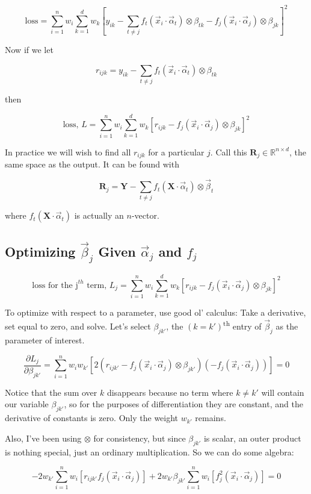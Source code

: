 \documentclass[12pt]{article}
\begin{document}
$$\text{loss} = \sum_{i=1}^n w_i \sum_{k=1}^d w_k [y_{ik} - \sum_{t \neq j} f_t(\vec{x}_i \cdot \vec{\alpha}_t) \otimes \beta_{tk} - f_j(\vec{x}_i \cdot \vec{\alpha}_j) \otimes \beta_{jk}]^2$$

Now if we let

$$r_{ijk} = y_{ik} - \sum_{t \neq j} f_t(\vec{x}_i \cdot \vec{\alpha}_t) \otimes \beta_{tk}$$

then

$$\text{loss, } L = \sum_{i=1}^n w_i \sum_{k=1}^d w_k [r_{ijk} - f_j(\vec{x}_i \cdot \vec{\alpha}_j) \otimes \beta_{jk}]^2$$

In practice we will wish to find all $r_{ijk}$ for a particular $j$. Call this $\pmb{R}_j \in \mathbb{R}^{n \times d}$, the same space as the output. It can be found with

$$\pmb{R}_j = \pmb{Y} - \sum_{t \neq j} f_t(\pmb{X} \cdot \vec{\alpha}_t) \otimes \vec{\beta}_t$$

where $f_t(\pmb{X} \cdot \vec{\alpha}_t)$ is actually an $n$-vector.

\subsection{Optimizing $\vec{\beta}_j$ Given $\vec{\alpha}_j$ and $f_j$}

$$\text{loss for the j}^{th}\text{ term, } L_j = \sum_{i=1}^n w_i \sum_{k=1}^d w_k [r_{ijk} - f_j(\vec{x}_i \cdot \vec{\alpha}_j) \otimes \beta_{jk}]^2$$

To optimize with respect to a parameter, use good ol' calculus: Take a derivative, set equal to zero, and solve. Let's select $\beta_{jk'}$, the $(k=k')$\textsuperscript{th} entry of $\vec{\beta}_j$ as the parameter of interest.

$$\frac{\partial L_j}{\partial \beta_{jk'}} = \sum_{i=1}^n w_i w_{k'} [2(r_{ijk'} - f_j(\vec{x}_i \cdot \vec{\alpha}_j) \otimes \beta_{jk'})(-f_j(\vec{x}_i \cdot \vec{\alpha}_j))] = 0$$

Notice that the sum over $k$ disappears because no term where $k \neq k'$ will contain our variable $\beta_{jk'}$, so for the purposes of differentiation they are constant, and the derivative of constants is zero. Only the weight $w_{k'}$ remains.

Also, I've been using $\otimes$ for consistency, but since $\beta_{jk'}$ is scalar, an outer product is nothing special, just an ordinary multiplication. So we can do some algebra:

$$ -2 w_{k'} \sum_{i=1}^n w_i [r_{ijk'} f_j(\vec{x}_i \cdot \vec{\alpha}_j)] + 2 w_{k'} \beta_{jk'} \sum_{i=1}^n w_i [f_j^2(\vec{x}_i \cdot \vec{\alpha}_j)] = 0 $$
\end{document}
